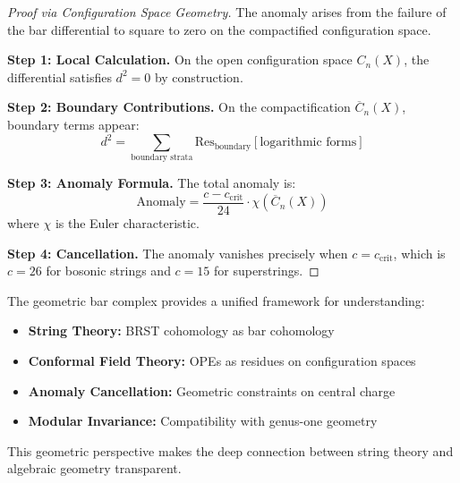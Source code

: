 \begin{proof}[Proof via Configuration Space Geometry]
The anomaly arises from the failure of the bar differential to square to zero on the compactified configuration space.

\textbf{Step 1: Local Calculation.} On the open configuration space $C_n(X)$, the differential satisfies $d^2 = 0$ by construction.

\textbf{Step 2: Boundary Contributions.} On the compactification $\overline{C}_n(X)$, boundary terms appear:
$$d^2 = \sum_{\text{boundary strata}} \text{Res}_{\text{boundary}}[\text{logarithmic forms}]$$

\textbf{Step 3: Anomaly Formula.} The total anomaly is:
$$\text{Anomaly} = \frac{c - c_{\text{crit}}}{24} \cdot \chi(\overline{C}_n(X))$$
where $\chi$ is the Euler characteristic.

\textbf{Step 4: Cancellation.} The anomaly vanishes precisely when $c = c_{\text{crit}}$, which is $c = 26$ for bosonic strings and $c = 15$ for superstrings.
\end{proof}

\begin{remark}
The geometric bar complex provides a unified framework for understanding:

\begin{itemize}
\item \textbf{String Theory:} BRST cohomology as bar cohomology
\item \textbf{Conformal Field Theory:} OPEs as residues on configuration spaces
\item \textbf{Anomaly Cancellation:} Geometric constraints on central charge
\item \textbf{Modular Invariance:} Compatibility with genus-one geometry
\end{itemize}

This geometric perspective makes the deep connection between string theory and algebraic geometry transparent.
\end{remark}
